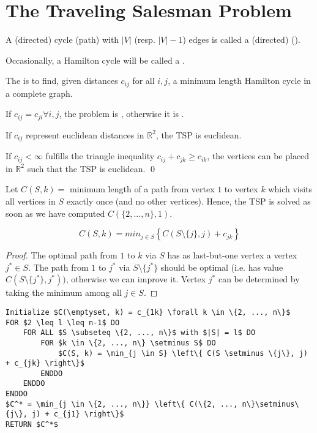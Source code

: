 \begin{lec}[2011-11-25]\end{lec}

\section*{The Traveling Salesman Problem}

\begin{defn}
A (directed) cycle (path) with $|V|$ (resp. $|V|-1$) edges is called a
(directed)  ().

Occasionally, a Hamilton cycle will be called a .

The  is
to find, given distances $c_{ij}$ for all $i, j$, a minimum length Hamilton
cycle in a complete graph.

If $c_{ij} = c_{ji} \forall i,j$, the problem is
, otherwise it is
.

If $c_{ij}$ represent euclidean distances in $\mathbb{R}^2$, the TSP is
euclidean.
\end{defn}

\begin{lem}\label{lem:13.2}
If $c_{ij} < \infty$ fulfills the triangle inequality $c_{ij} + c_{jk} \geq
c_{ik}$, the vertices can be placed in $\mathbb{R}^2$ such that the TSP is
euclidean.
\qed
\end{lem}

Let $C(S, k) =$ minimum length of a path from vertex $1$ to vertex $k$ which
visits all vertices in $S$ exactly once (and no other vertices).
Hence, the TSP is solved as soon as we have computed $C(\{2, ..., n\}, 1)$.

\begin{lem}
\[
C(S, k) = min_{j \in S} \left\{ C(S \setminus \{j\}, j) + c_{jk} \right\}
\]
\end{lem}
\begin{proof}
The optimal path from $1$ to $k$ via $S$ has as last-but-one vertex a vertex
$j^* \in S$. The path from $1$ to $j^*$ via $S \setminus \{j^*\}$ should be
optimal (i.e. has value $C(S \setminus \{j^*\}, j^*))$, otherwise we can
improve it. Vertex $j^*$ can be determined by taking the minimum among all
$j \in S$.
\end{proof}

\begin{lstlisting}[caption=Held-Karp Algorithm for TSP]
Initialize $C(\emptyset, k) = c_{1k} \forall k \in \{2, ..., n\}$
FOR $2 \leq l \leq n-1$ DO
	FOR ALL $S \subseteq \{2, ..., n\}$ with $|S| = l$ DO
		FOR $k \in \{2, ..., n\} \setminus S$ DO
			$C(S, k) = \min_{j \in S} \left\{ C(S \setminus \{j\}, j) + c_{jk} \right\}$
		ENDDO
	ENDDO
ENDDO
$C^* = \min_{j \in \{2, ..., n\}} \left\{ C(\{2, ..., n\}\setminus\{j\}, j) + c_{j1} \right\}$
RETURN $C^*$
\end{lstlisting}

